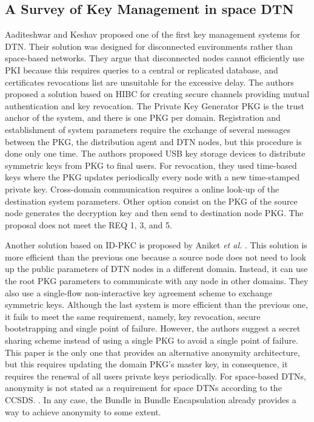 \subsection{A Survey of Key Management in space DTN}

Aaditeshwar and Keshav \cite{seth2005practical} proposed one of the first key management systems for DTN. Their solution was designed for disconnected environments rather than space-based networks. They argue that disconnected nodes cannot efficiently use PKI because this requires queries to a central or replicated database, and certificates revocations list are unsuitable for the excessive delay. The authors proposed a solution based on HIBC for creating secure channels providing mutual authentication and key revocation. The Private Key Generator PKG is the trust anchor of the system, and there is one PKG per domain. Registration and establishment of system parameters require the exchange of several messages between the PKG, the distribution agent and DTN nodes, but this procedure is done only one time. The authors proposed USB key storage devices to distribute symmetric keys from PKG to final users. For revocation, they used time-based keys where the PKG updates periodically every node with a new time-stamped private key. Cross-domain communication requires a online look-up of the destination system parameters. Other option consist on the PKG of the source node generates the decryption key and then send to destination node PKG. The proposal does not meet the REQ 1, 3, and 5.


Another solution based on ID-PKC is proposed by Aniket \textit{et al.} \cite{kate2007anonymity}. This solution is more efficient than the previous one because a source node does not need to look up the public parameters of DTN nodes in a different domain. Instead, it can use the root PKG parameters to communicate with any node in other domains. They also use a single-flow non-interactive key agreement scheme to exchange symmetric keys.
Although the last system is more efficient than the previous one, it fails to meet the same requirement, namely, key revocation, secure bootstrapping and single point of failure. However, the authors suggest a secret sharing scheme instead of using a single PKG to avoid a single point of failure. This paper is the only one that provides an alternative anonymity architecture, but this requires updating the domain PKG's master key, in consequence, it requires the renewal of all users private keys periodically. For space-based DTNs, anonymity is not stated as a requirement for space DTNs according to the CCSDS. \cite{book2011space}. In any case, the Bundle in Bundle Encapsulation \cite{ietf-dtn-bibect-00} already provides a way to achieve anonymity to some extent. 

